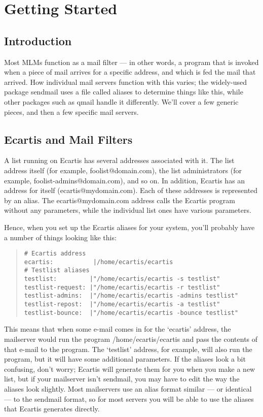 \documentclass{book}
\begin{document}
\chapter{Getting Started}
\label{starting}
   
\section{Introduction}
\label{starting:intro}

Most MLMs function as a mail filter --- in other words, a program that is
invoked when a piece of mail arrives for a specific address, and which is fed
the mail that arrived.  How individual mail servers function with this varies;
the widely-used package sendmail uses a file called aliases to determine
things like this, while other packages such as qmail handle it differently.
We'll cover a few generic pieces, and then a few specific mail servers.
   
\section{Ecartis and Mail Filters}
\label{starting:filters}

A list running on Ecartis has several addresses associated with it.  The list
address itself (for example, foolist@domain.com), the list administrators (for
example, foolist-admins@domain.com), and so on.  In addition, Ecartis has an
address for itself (ecartis@mydomain.com).  Each of these addresses is
represented by an alias.  The ecartis@mydomain.com address calls the Ecartis
program without any parameters, while the individual list ones have various
parameters.
   
Hence, when you set up the Ecartis aliases for your system, you'll probably
have a number of things looking like this:
   
\begin{quote}
\footnotesize
\begin{verbatim}
# Ecartis address
ecartis:           |/home/ecartis/ecartis
# Testlist aliases
testlist:         |"/home/ecartis/ecartis -s testlist"
testlist-request: |"/home/ecartis/ecartis -r testlist"
testlist-admins:  |"/home/ecartis/ecartis -admins testlist"
testlist-repost:  |"/home/ecartis/ecartis -a testlist"
testlist-bounce:  |"/home/ecartis/ecartis -bounce testlist"
\end{verbatim}
\end{quote}

This means that when some e-mail comes in for the `ecartis' address, the
mailserver would run the program /home/ecartis/ecartis and pass the contents of
that e-mail to the program.  The `testlist' address, for example, will also
run the program, but it will have some additional parameters.  If the aliases
look a bit confusing, don't worry; Ecartis will generate them for you when you
make a new list, but if your mailserver isn't sendmail, you may have to edit
the way the aliases look slightly.  Most mailservers use an alias format
similar --- or identical --- to the sendmail format, so for most servers you
will be able to use the aliases that Ecartis generates directly.
   
\end{document}
